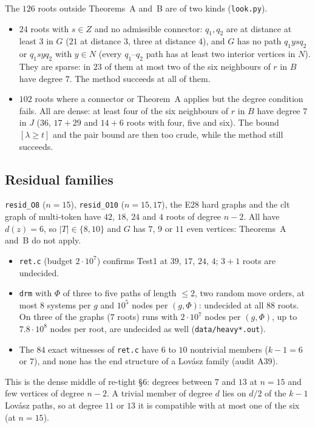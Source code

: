 \documentclass[11pt]{amsart}
\theoremstyle{definition}
\begin{document}
The $126$ roots outside Theorems~A and~B are of two kinds (\texttt{look.py}).
\begin{itemize}[leftmargin=*]
\item $24$ roots with $s\in Z$ and no admissible connector: $q_1,q_2$ are at distance at least $3$ in $G$ ($21$ at
distance $3$, three at distance $4$), and $G$ has no path $q_1ysq_2$ or $q_1syq_2$ with $y\in N$ (every $q_1$--$q_2$ path has at least two interior vertices in $N$). They
are sparse: in $23$ of them at most two of the six neighbours of $r$ in $B$ have degree $7$. The method succeeds at all of them.
\item $102$ roots where a connector or Theorem~A applies but the degree condition fails. All are
dense: at least four of the six neighbours of $r$ in $B$ have degree $7$ in $J$ ($36$, $17+29$ and
$14+6$ roots with four, five and six). The bound $[\lambda\ge t]$ and the pair bound are then too
crude, while the method still succeeds.
\end{itemize}

\subsection*{Residual families} \texttt{resid\_O8} ($n=15$), \texttt{resid\_O10} ($n=15,17$), the E28
hard graphs and the clt graph of multi-token have $42$, $18$, $24$ and $4$ roots of degree $n-2$. All have
$d(z)=6$, so $|T|\in\{8,10\}$ and $G$ has $7$, $9$ or $11$ even vertices: Theorems~A and~B do not apply.
\begin{itemize}[leftmargin=*]
\item \texttt{ret.c} (budget $2\cdot10^7$) confirms Test1 at $39$, $17$, $24$, $4$; $3+1$ roots are
undecided.
\item \texttt{drm} with $\Phi$ of three to five paths of length $\le2$, two random move orders, at most
$8$ systems per $g$ and $10^5$ nodes per $(g,\Phi)$: undecided at all $88$ roots. On three of the
graphs ($7$ roots) runs with $2\cdot10^7$ nodes per $(g,\Phi)$, up to $7.8\cdot10^8$ nodes per root,
are undecided as well (\texttt{data/heavy*.out}).
\item The $84$ exact witnesses of \texttt{ret.c} have $6$ to $10$ nontrivial members ($k-1=6$ or $7$),
and none has the end structure of a Lov\'asz family (audit A39).
\end{itemize}
This is the dense middle of re-tight \S6: degrees between $7$ and $13$ at $n=15$ and few vertices of
degree $n-2$. A trivial member of degree $d$ lies on $d/2$ of the $k-1$ Lov\'asz paths, so at degree
$11$ or $13$ it is compatible with at most one of the six (at $n=15$).
\end{document}
